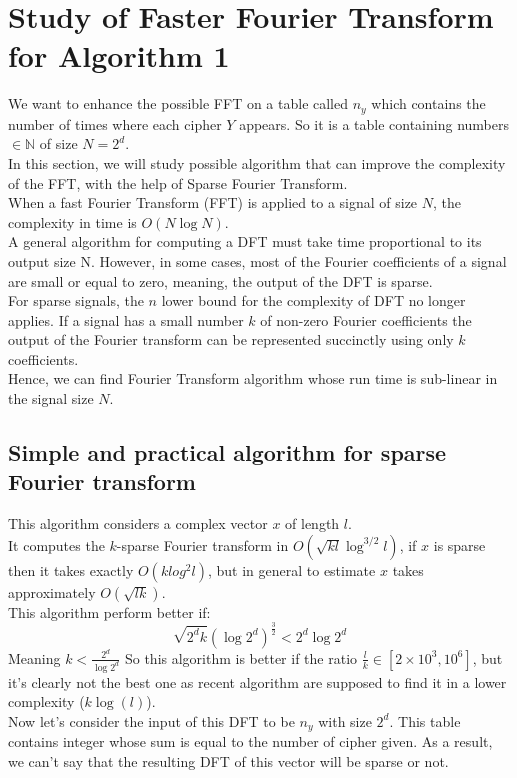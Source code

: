 \documentclass{article}
\begin{document}
\section{Study of Faster Fourier Transform for Algorithm 1}
We want to enhance the possible FFT on a table called $n_y$ which contains the number of times where each cipher $Y$ appears. So it is a table containing numbers $\in \mathbb{N}$ of size $N=2^d$.\\
In this section, we will study possible algorithm that can improve the complexity of the FFT, with the help of Sparse Fourier Transform.\\
When a fast Fourier Transform (FFT) is applied to a signal of size $N$, the complexity in time is $O(N\log N)$.\\
A general algorithm for computing a DFT must take time proportional to its output size N. However, in some cases, most of the Fourier coefficients of a signal are small or equal to zero, meaning, the output of the DFT is sparse.\\
For sparse signals, the $n$ lower bound for the complexity of DFT no longer applies. If a signal has a small number $k$ of non-zero Fourier coefficients the output of the Fourier transform can be represented succinctly using only $k$ coefficients.\\
Hence, we can find Fourier Transform algorithm whose run time is sub-linear in the signal size $N$.\\


\subsection{Simple and practical algorithm for sparse Fourier transform}
This algorithm considers a complex vector $x$ of length $l$.\\
It computes the $k$-sparse Fourier transform in $O(\sqrt{kl}\log^{3/2}l)$, if $x$ is sparse then it takes exactly $O(klog^{2}l)$, but in general to estimate $x$ takes approximately $O(\sqrt{lk})$.\\
This algorithm perform better if:
$$\sqrt{2^d k}(\log2^d)^\frac{3}{2} < 2^d \log2^d$$
Meaning $k<\frac{2^d}{\log 2^d}$
So this algorithm is better if the ratio $\frac{l}{k} \in [2 \times 10^3, 10^6]$, but it's clearly not the best one as recent algorithm are supposed to find it in a lower complexity ($k\log(l)$).\\
Now let's consider the input of this DFT to be $n_y$ with size $2^d$. This table contains integer whose sum is equal to the number of cipher given. As a result, we can't say that the resulting DFT of this vector will be sparse or not.
\end{document}
